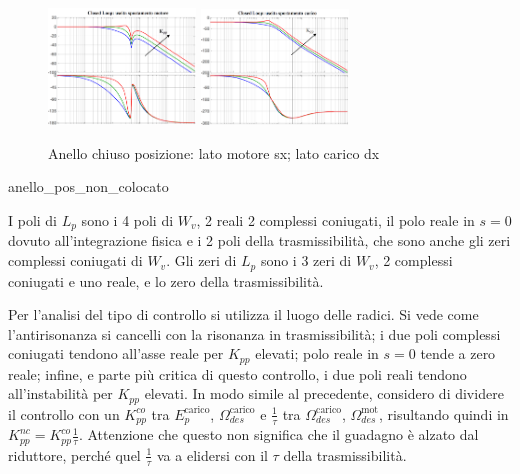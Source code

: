 \begin{figure}[h]
    \centering
    \includegraphics[width=0.35\textwidth]{Immagini/anello_chiuso_posizione_lato_motore.png}
    \includegraphics[width=0.35\textwidth]{Immagini/anello_chiuso_posizione_lato_carico.png}
    \caption{Anello chiuso posizione: lato motore sx; lato carico dx}
\end{figure}



{anello_pos_non_colocato}

I poli di \(L_p\) sono i 4 poli di \(W_v\), 2 reali 2 complessi coniugati, il polo reale in \(s=0\) dovuto all'integrazione fisica e i 2 poli della trasmissibilità, che sono anche gli zeri complessi coniugati di \(W_v\).
Gli zeri di \(L_p\) sono i 3 zeri di \(W_v\), 2 complessi coniugati e uno reale, e lo zero della trasmissibilità.


Per l'analisi del tipo di controllo si utilizza il luogo delle radici. Si vede come l'antirisonanza si cancelli con la risonanza in trasmissibilità; i due poli complessi coniugati tendono all'asse reale per \(K_{pp}\) elevati; polo reale in \(s=0\) tende a zero reale; infine, e parte più critica di questo controllo, i due poli reali tendono all'instabilità per \(K_{pp}\) elevati.
In modo simile al precedente, considero di dividere il controllo con un \(K_{pp}^{co}\) tra \(E_p^\text{carico}\), \(\Omega_{des}^\text{carico}\) e \(\frac{1}{\tau}\) tra \(\Omega_{des}^\text{carico}\), \(\Omega_{des}^\text{mot}\), risultando quindi in \(K_{pp}^{nc} = K_{pp}^{co} \frac{1}{\tau}\).
Attenzione che questo non significa che il guadagno è alzato dal riduttore, perché quel \(\frac{1}{\tau}\) va a elidersi con il \(\tau\) della trasmissibilità.


